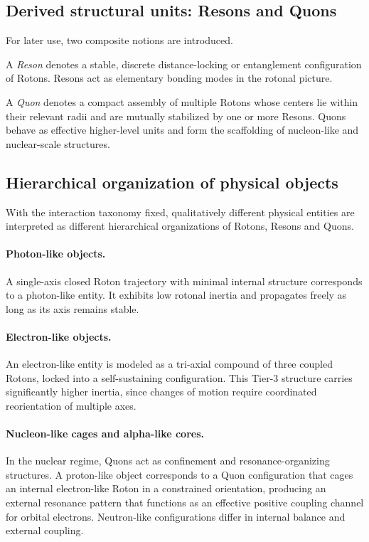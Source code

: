 \documentclass[11pt,a4paper]{article}
\begin{document}
\subsection{Derived structural units: Resons and Quons}

For later use, two composite notions are introduced.

A \emph{Reson} denotes a stable, discrete distance-locking or entanglement configuration of
Rotons. Resons act as elementary bonding modes in the rotonal picture.

A \emph{Quon} denotes a compact assembly of multiple Rotons whose centers lie within their
relevant radii and are mutually stabilized by one or more Resons. Quons behave as effective
higher-level units and form the scaffolding of nucleon-like and nuclear-scale structures.

\subsection{Hierarchical organization of physical objects}

With the interaction taxonomy fixed, qualitatively different physical entities are interpreted
as different hierarchical organizations of Rotons, Resons and Quons.

\paragraph{Photon-like objects.}
A single-axis closed Roton trajectory with minimal internal structure corresponds to a
photon-like entity. It exhibits low rotonal inertia and propagates freely as long as its
axis remains stable.

\paragraph{Electron-like objects.}
An electron-like entity is modeled as a tri-axial compound of three coupled Rotons, locked
into a self-sustaining configuration. This Tier-3 structure carries significantly higher
inertia, since changes of motion require coordinated reorientation of multiple axes.

\paragraph{Nucleon-like cages and alpha-like cores.}
In the nuclear regime, Quons act as confinement and resonance-organizing structures.
A proton-like object corresponds to a Quon configuration that cages an internal
electron-like Roton in a constrained orientation, producing an external resonance pattern
that functions as an effective positive coupling channel for orbital electrons.
Neutron-like configurations differ in internal balance and external coupling.
\end{document}
